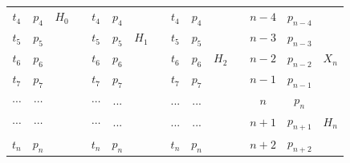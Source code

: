 \documentclass
[twocolumn,
secnumarabic,
nobibnotes,
aps,
prl,
reprint,
groupedaddress,
amsmath,
amssymb,
]{revtex4-2}
\begin{document}
\begin{center}
\begin{tabular}{|c|c|cc|c|c|cc|c|c|cc|c|c|c}
  $t_4$        & \cellcolor[HTML]{A2E4F6}$p_4$ & \textbf{$H_0$} &  & $t_4$                         & \cellcolor[HTML]{C0C0C0}$p_4$ &                &  & $t_4$                         & \cellcolor[HTML]{C0C0C0}$p_4$ &                &  & \cellcolor[HTML]{FFFFFF}$n-4$ & \cellcolor[HTML]{FFFFFF}$p_{n-4}$ &                  \\ \cline{1-2} \cline{5-6} \cline{9-10} \cline{13-14}
  $t_5$        & \cellcolor[HTML]{A2E4F6}$p_5$ &                &  & $t_5$                         & \cellcolor[HTML]{A2E4F6}$p_5$ & \textbf{$H_1$} &  & $t_5$                         & \cellcolor[HTML]{C0C0C0}$p_5$ & \textbf{}      &  & \cellcolor[HTML]{C0C0C0}$n-3$ & \cellcolor[HTML]{C0C0C0}$p_{n-3}$ &                  \\ \cline{1-2} \cline{5-6} \cline{9-10} \cline{13-14}
  $t_6$        & $p_6$                         &                &  & $t_6$                         & \cellcolor[HTML]{A2E4F6}$p_6$ &                &  & $t_6$                         & \cellcolor[HTML]{A2E4F6}$p_6$ & \textbf{$H_2$} &  & \cellcolor[HTML]{C0C0C0}$n-2$ & \cellcolor[HTML]{C0C0C0}$p_{n-2}$ & \textbf{$X_{n}$} \\ \cline{1-2} \cline{5-6} \cline{9-10} \cline{13-14}
  $t_7$        & $p_7$                         &                &  & $t_7$                         & $p_7$                         &                &  & $t_7$                         & \cellcolor[HTML]{A2E4F6}$p_7$ &                &  & \cellcolor[HTML]{C0C0C0}$n-1$ & \cellcolor[HTML]{C0C0C0}$p_{n-1}$ &                  \\ \cline{1-2} \cline{5-6} \cline{9-10} \cline{13-14}
  $\cdots$          & $\cdots$                           &                &  & $\cdots$                           & ...                           &                &  & ...                           & ...                           &                &  & \cellcolor[HTML]{C0C0C0}$n$   & \cellcolor[HTML]{C0C0C0}$p_{n}$   & \textbf{}        \\ \cline{1-2} \cline{5-6} \cline{9-10} \cline{13-14}
  $\cdots$          & $\cdots$                           &                &  & $\cdots$                           & ...                           &                &  & ...                           & ...                           &                &  & \cellcolor[HTML]{A2E4F6}$n+1$ & \cellcolor[HTML]{A2E4F6}$p_{n+1}$ & \textbf{$H_{n}$} \\ \cline{1-2} \cline{5-6} \cline{9-10} \cline{13-14}
  $t_n$        & $p_n$                         &                &  & $t_n$                         & $p_n$                         &                &  & $t_n$                         & $p_n$                         &                &  & \cellcolor[HTML]{A2E4F6}$n+2$ & \cellcolor[HTML]{A2E4F6}$p_{n+2}$ &                  \\ \cline{1-2} \cline{5-6} \cline{9-10} \cline{13-14}
  \end{tabular}
  \end{center}
\end{document}
